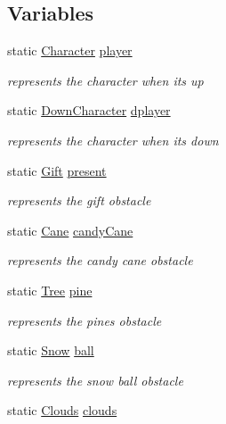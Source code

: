 \subsection*{Variables}
\begin{DoxyCompactItemize}
\item 
static \hyperlink{struct_character}{Character} \hyperlink{group___graphics_ga6be64c98dff07b5401940d55c9f75d83}{player}
\begin{DoxyCompactList}\small\item\em represents the character when it\textquotesingle{}s up \end{DoxyCompactList}\item 
static \hyperlink{struct_down_character}{Down\+Character} \hyperlink{group___graphics_ga37faf6b2351ee87a7ab6f3ea9c2a02f4}{dplayer}
\begin{DoxyCompactList}\small\item\em represents the character when it\textquotesingle{}s down \end{DoxyCompactList}\item 
static \hyperlink{struct_gift}{Gift} \hyperlink{group___graphics_ga6f8fa1a6c397b5d7b17fc82133bfa3d4}{present}
\begin{DoxyCompactList}\small\item\em represents the gift obstacle \end{DoxyCompactList}\item 
static \hyperlink{struct_cane}{Cane} \hyperlink{group___graphics_gaba4d7c50cbd75917285fd6c4ec1c1c10}{candy\+Cane}
\begin{DoxyCompactList}\small\item\em represents the candy cane obstacle \end{DoxyCompactList}\item 
static \hyperlink{struct_tree}{Tree} \hyperlink{group___graphics_ga98e0c9c163d4fadfce76eebf07b783bf}{pine}
\begin{DoxyCompactList}\small\item\em represents the pines obstacle \end{DoxyCompactList}\item 
static \hyperlink{struct_snow}{Snow} \hyperlink{group___graphics_ga5b8079ec1b1df7ef0f8f93056f52b221}{ball}
\begin{DoxyCompactList}\small\item\em represents the snow ball obstacle \end{DoxyCompactList}\item 
static \hyperlink{struct_clouds}{Clouds} \hyperlink{group___graphics_ga6e84b95e51e590713cb4891fbe59ea3b}{clouds}

\end{DoxyCompactItemize}
